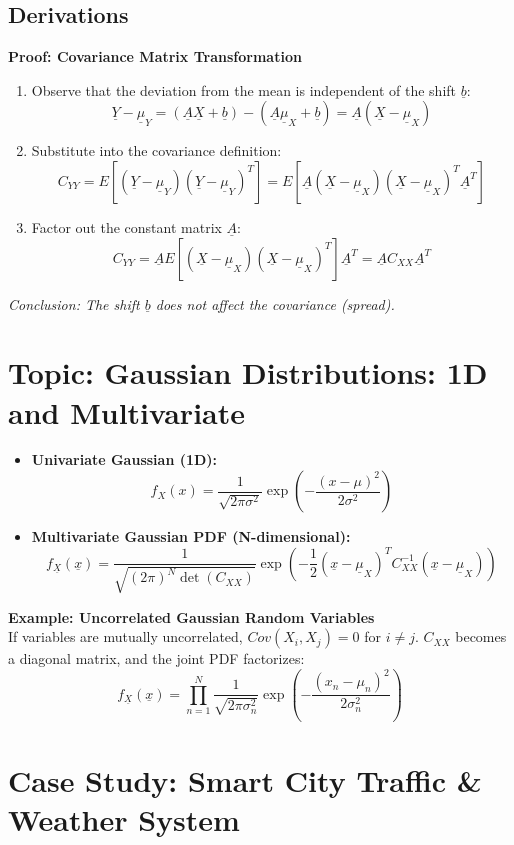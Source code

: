 \documentclass{article}
\renewcommand{\vec}[1]{\underline{#1}}
\begin{document}
\subsection*{Derivations}
\textbf{Proof: Covariance Matrix Transformation}
\begin{enumerate}
    \item Observe that the deviation from the mean is independent of the shift $\vec{b}$:
    \[ \vec{Y} - \vec{\mu}_{Y} = (\vec{A}\vec{X} + \vec{b}) - (\vec{A}\vec{\mu}_{X} + \vec{b}) = \vec{A}(\vec{X} - \vec{\mu}_{X}) \]
    \item Substitute into the covariance definition:
    \[ C_{YY} = E[(\vec{Y} - \vec{\mu}_{Y})(\vec{Y} - \vec{\mu}_{Y})^T] = E[\vec{A}(\vec{X} - \vec{\mu}_{X})(\vec{X} - \vec{\mu}_{X})^T \vec{A}^T] \]
    \item Factor out the constant matrix $\vec{A}$:
    \[ C_{YY} = \vec{A} E[(\vec{X} - \vec{\mu}_{X})(\vec{X} - \vec{\mu}_{X})^T] \vec{A}^T = \vec{A}C_{XX}\vec{A}^{T} \]
\end{enumerate}
\textit{Conclusion: The shift $\vec{b}$ does not affect the covariance (spread).}

\hr
\section*{Topic: Gaussian Distributions: 1D and Multivariate}

\begin{itemize}
    \item \textbf{Univariate Gaussian (1D):} 
    \[ f_{X}(x) = \frac{1}{\sqrt{2\pi\sigma^{2}}} \exp\left(-\frac{(x-\mu)^{2}}{2\sigma^{2}}\right) \]
    
    \item \textbf{Multivariate Gaussian PDF (N-dimensional):} 
    \[ f_{\vec{X}}(\vec{x}) = \frac{1}{\sqrt{(2\pi)^{N} \det(C_{XX})}} \exp\left(-\frac{1}{2}(\vec{x}-\vec{\mu}_{X})^{T} C_{XX}^{-1} (\vec{x}-\vec{\mu}_{X})\right) \]
\end{itemize}



\textbf{Example: Uncorrelated Gaussian Random Variables} \\
If variables are mutually uncorrelated, $Cov(X_i, X_j) = 0$ for $i \neq j$. $C_{XX}$ becomes a diagonal matrix, and the joint PDF factorizes:
\[ f_{\vec{X}}(\vec{x}) = \prod_{n=1}^{N} \frac{1}{\sqrt{2\pi\sigma_n^2}} \exp\left(-\frac{(x_n - \mu_n)^2}{2\sigma_n^2}\right) \]

\hr
\section*{Case Study: Smart City Traffic \& Weather System}
\end{document}
